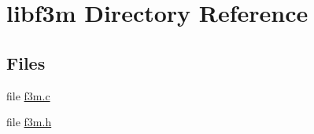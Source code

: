 \hypertarget{dir_000002}{}\section{libf3m Directory Reference}
\label{dir_000002}
\subsection*{Files}
\begin{DoxyCompactItemize}
\item 
file \hyperlink{f3m_8c}{f3m.\+c}
\item 
file \hyperlink{f3m_8h}{f3m.\+h}
\end{DoxyCompactItemize}
